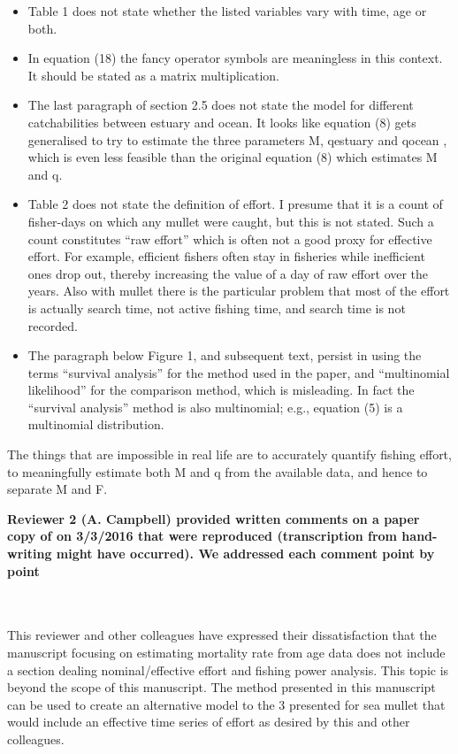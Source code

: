 \documentclass[11pt]{article}
\begin{document}
\begin{spacing}{1.2}
{\begin{itemize}
\item Table 1 does not state whether the listed variables vary with time, age or both.

\item In equation (18) the fancy operator symbols are meaningless in this context.  It should be stated as a matrix multiplication.

\item The last paragraph of section 2.5 does not state the model for different catchabilities between estuary and ocean.  It looks like equation (8) gets generalised to try to estimate the three parameters M, qestuary and qocean , which is even less feasible than the original equation (8) which estimates M and q.

\item Table 2 does not state the definition of effort.  I presume that it is a count of fisher-days on which any mullet were caught, but this is not stated.  Such a count constitutes “raw effort” which is often not a good proxy for effective effort.  For example, efficient fishers often stay in fisheries while inefficient ones drop out, thereby increasing the value of a day of raw effort over the years.  Also with mullet there is the particular problem that most of the effort is actually search time, not active fishing time, and search time is not recorded.

\item The paragraph below Figure 1, and subsequent text, persist in using the terms “survival analysis” for the method used in the paper, and “multinomial likelihood” for the comparison method, which is misleading.  In fact the “survival analysis” method is also multinomial; e.g., equation (5) is a multinomial distribution.
\end{itemize}
 
The things that are impossible in real life are to accurately quantify fishing effort, to meaningfully estimate both M and q from the available data, and hence to separate M and F.


{\bf Reviewer 2 (A. Campbell) provided written comments on a paper copy of \citep{Kienzle2015} on 3/3/2016 that were reproduced (transcription from hand-writing might have occurred). We addressed each comment point by point}\\

 \\
\vspace{3cm}

 \\
This reviewer and other colleagues have expressed their dissatisfaction that the manuscript focusing on estimating mortality rate from age data does not include a section dealing nominal/effective effort and fishing power analysis. This topic is beyond the scope of this manuscript. The method presented in this manuscript can be used to create an alternative model to the 3 presented for sea mullet that would include an effective time series of effort as desired by this and other colleagues. \\

}
\end{spacing}
\end{document}
